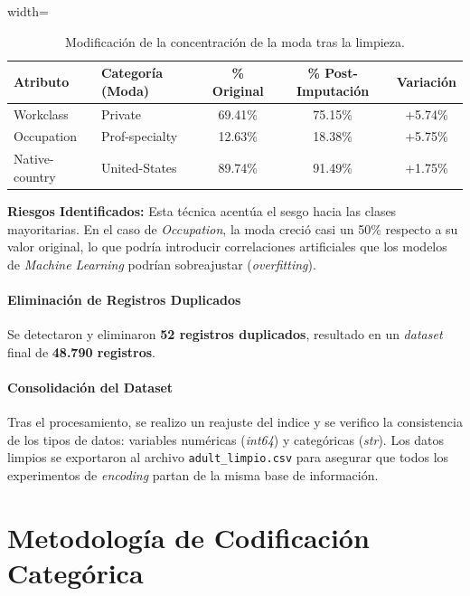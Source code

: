\documentclass[a4paper,10pt]{book}
\begin{document}
		\begin{table}[H]
			\centering
			\begin{adjustbox}{width=\textwidth}
				\begin{tabular}{|l|l|c|c|c|}
					\hline
					\rowcolor{TNcolor} 
					\textbf{Atributo} & \textbf{Categoría (Moda)} & \textbf{\% Original} & \textbf{\% Post-Imputación} & \textbf{Variación} \\ \hline
					Workclass & Private & 69.41\% & 75.15\% & +5.74\% \\ \hline
					Occupation & Prof-specialty & 12.63\% & 18.38\% & +5.75\% \\ \hline
					Native-country & United-States & 89.74\% & 91.49\% & +1.75\% \\ \hline
				\end{tabular}
			\end{adjustbox}
			\caption{Modificación de la concentración de la moda tras la limpieza.}
			\label{tab:distribucion_cambio}
		\end{table}
		
		\textbf{Riesgos Identificados:} Esta técnica acentúa el sesgo hacia las clases mayoritarias. En el caso de \textit{Occupation}, la moda creció casi un 50\% respecto a su valor original, lo que podría introducir correlaciones artificiales que los modelos de \textit{Machine Learning} podrían sobreajustar (\textit{overfitting}).
		

		\subsubsection{Eliminación de Registros Duplicados} 
			Se detectaron y eliminaron \textbf{52 registros duplicados}, resultado en un \textit{dataset} final de \textbf{48.790 registros}.
		
		\subsubsection{Consolidación del Dataset} 
			Tras el procesamiento, se realizo un reajuste del indice y se verifico la consistencia de los tipos de datos: variables numéricas (\textit{int64}) y categóricas (\textit{str}). Los datos limpios se exportaron al archivo  \texttt{adult\_limpio.csv} para asegurar que todos los experimentos de \textit{encoding} partan de la misma base de información.
		
	
	\chapter{Metodología de Codificación Categórica}
	\label{ch:metodologia}
		
\end{document}
